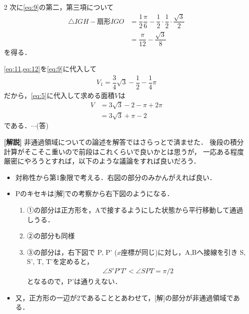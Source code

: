 \documentclass[../../main.tex]{subfiles}
\begin{document}
\begin{multicols}{2}
  次に\cref{eq:9}の第二，第三項について
  \begin{align}
    \triangle IGH - \text{扇形}IGO
    & = \dfrac{1}{2}\dfrac{\pi}{6} - \dfrac{1}{2}\cdot \dfrac{1}{2} \cdot \dfrac{\sqrt{3}}{2} \\
    & = \dfrac{\pi}{12} - \dfrac{\sqrt{3}}{8} \label{eq:12}
  \end{align}
  を得る．

  \cref{eq:11,eq:12}を\cref{eq:9}に代入して
  \begin{align}
    V_1 = \dfrac{3}{4}\sqrt{3} - \dfrac{1}{2} - \dfrac{1}{4}\pi
  \end{align}
  だから，\cref{eq:5}に代入して求める面積$V$は
  \begin{align}
    V
    &
    = 3\sqrt{3}-2-\pi+2\pi \\
    & = 3\sqrt{3}+\pi-2
  \end{align}
  である．$\cdots$(答)

  {\bf [解説]}
  非通過領域についての論述を解答ではさらっとで済ませた．
  後段の積分計算がそこそこ重いので前段はこれくらいで良いかとは思うが，
  一応ある程度厳密にやろうとすれば，以下のような議論をすれば良いだろう．

  \begin{itemize}
    \item 対称性から第1象限で考える．右図の部分のみかんがえれば良い．
    \item Pのキセキは[解]での考察から右下図のようになる．
      \begin{enumerate}
        \item ①の部分は正方形を，Aで接するようにした状態から平行移動して通過しうる．
        \item ②の部分も同様
        \item ③の部分は，右下図で P, P' ($x$座標が同じ)に対し，A,Bへ接線を引き S, S', T, T'を定めると，
          \begin{align}
            \angle S'P'T' < \angle SPT = \pi/2
          \end{align}
          となるので，P'は通りえない．
      \end{enumerate}
    \item 又，正方形の一辺が2であることとあわせて，[解]の部分が非通過領域である．
  \end{itemize}

  \newpage
\end{multicols}
\end{document}
